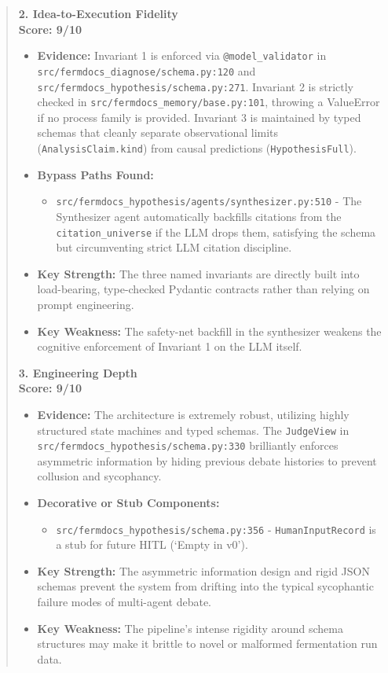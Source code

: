 \documentclass[11pt]{article}
\begin{document}
\begin{quote}
\textbf{2. Idea-to-Execution Fidelity} \\
\textbf{Score: 9/10}
\begin{itemize}[leftmargin=*,noitemsep]
\item \textbf{Evidence:} Invariant 1 is enforced via \texttt{@model\_validator} in \texttt{src/fermdocs\_diagnose/schema.py:120} and \texttt{src/fermdocs\_hypothesis/schema.py:271}. Invariant 2 is strictly checked in \texttt{src/fermdocs\_memory/base.py:101}, throwing a ValueError if no process family is provided. Invariant 3 is maintained by typed schemas that cleanly separate observational limits (\texttt{AnalysisClaim.kind}) from causal predictions (\texttt{HypothesisFull}).
\item \textbf{Bypass Paths Found:}
  \begin{itemize}[leftmargin=*,noitemsep]
  \item \texttt{src/fermdocs\_hypothesis/agents/synthesizer.py:510} - The Synthesizer agent automatically backfills citations from the \texttt{citation\_universe} if the LLM drops them, satisfying the schema but circumventing strict LLM citation discipline.
  \end{itemize}
\item \textbf{Key Strength:} The three named invariants are directly built into load-bearing, type-checked Pydantic contracts rather than relying on prompt engineering.
\item \textbf{Key Weakness:} The safety-net backfill in the synthesizer weakens the cognitive enforcement of Invariant 1 on the LLM itself.
\end{itemize}

\textbf{3. Engineering Depth} \\
\textbf{Score: 9/10}
\begin{itemize}[leftmargin=*,noitemsep]
\item \textbf{Evidence:} The architecture is extremely robust, utilizing highly structured state machines and typed schemas. The \texttt{JudgeView} in \texttt{src/fermdocs\_hypothesis/schema.py:330} brilliantly enforces asymmetric information by hiding previous debate histories to prevent collusion and sycophancy.
\item \textbf{Decorative or Stub Components:}
  \begin{itemize}[leftmargin=*,noitemsep]
  \item \texttt{src/fermdocs\_hypothesis/schema.py:356} - \texttt{HumanInputRecord} is a stub for future HITL (`Empty in v0').
  \end{itemize}
\item \textbf{Key Strength:} The asymmetric information design and rigid JSON schemas prevent the system from drifting into the typical sycophantic failure modes of multi-agent debate.
\item \textbf{Key Weakness:} The pipeline's intense rigidity around schema structures may make it brittle to novel or malformed fermentation run data.
\end{itemize}


\end{quote}
\end{document}
